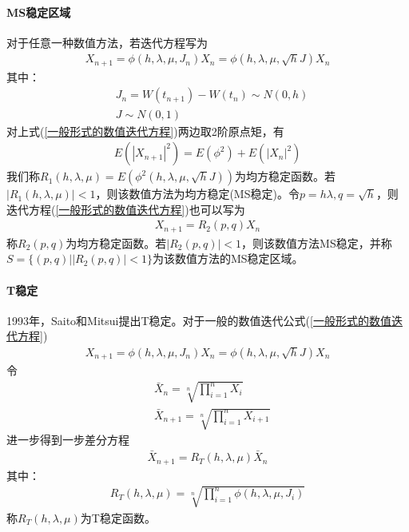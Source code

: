             \paragraph{MS稳定区域}
            对于任意一种数值方法，若迭代方程写为
            \begin{align}
                \label{一般形式的数值迭代方程}
                X_{n+1} = \phi(h,\lambda ,\mu ,J_n)X_n = \phi(h,\lambda,\mu,\sqrt{h}J)X_n
            \end{align}
            其中：
            \begin{align*}
                &J_n = W(t_{n+1}) - W(t_n) \sim N(0,h)\\
                &J\sim N(0,1)
            \end{align*}
            对上式(\ref{一般形式的数值迭代方程})两边取2阶原点矩，有
            \begin{align*}
                E \left( |X_{n+1}|^2 \right) = E \left( \phi^2 \right) + E \left( |X_n|^2 \right)
            \end{align*}
            我们称$R_1(h,\lambda,\mu) = E \left( \phi^2(h,\lambda,\mu,\sqrt{h}J) \right)$为均方稳定函数。若$|R_1(h,\lambda,\mu)|<1$，则该数值方法为均方稳定(MS稳定)。令$p = h\lambda,q = \sqrt{h}$，则迭代方程(\ref{一般形式的数值迭代方程})也可以写为
            \begin{align*}
            X_{n+1} = R_2(p,q)X_n
            \end{align*}
            称$R_2(p,q)$为均方稳定函数。若$|R_2(p,q)|<1$，则该数值方法MS稳定，并称$S = \{ (p,q)| |R_2(p,q)|<1\}$为该数值方法的MS稳定区域。
            \paragraph{T稳定}1993年，Saito和Mitsui提出T稳定。对于一般的数值迭代公式(\ref{一般形式的数值迭代方程})
            \begin{align*}
                X_{n+1} = \phi(h,\lambda ,\mu ,J_n)X_n = \phi(h,\lambda,\mu,\sqrt{h}J)X_n
            \end{align*}
            令
            \begin{align*}
                &\bar{X}_n = \sqrt[n]{\prod_{i = 1}^nX_i}\\
                &\bar{X}_{n+1} = \sqrt[n]{\prod_{i = 1}^nX_{i+1}}
            \end{align*}
            进一步得到一步差分方程
            \begin{align*}
                \bar{X}_{n+1} = R_T(h,\lambda,\mu)\bar{X}_n
            \end{align*}
            其中：
            \begin{align*}
                R_T(h,\lambda,\mu) = \sqrt[n]{\prod_{i=1}^n \phi(h,\lambda ,\mu ,J_i)}
            \end{align*}
            称$R_T(h,\lambda,\mu)$为T稳定函数。
